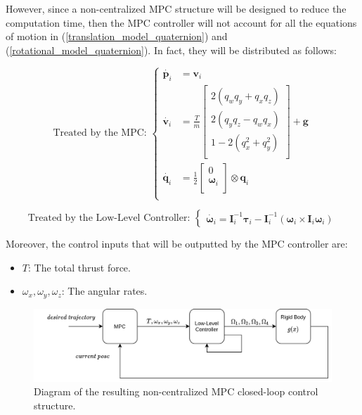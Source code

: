 \documentclass{thesisreport}
\begin{document}
However, since a non-centralized MPC structure will be designed to reduce the computation time, then the MPC controller will not account for all the equations of motion in (\ref{translation_model_quaternion}) and (\ref{rotational_model_quaternion}). In fact, they will be distributed as follows: 

				\begin{equation*}
					\text{Treated by the MPC: }\left\{
					\begin{array}{lll}				
					\dot{\bm{p}_i} &= \bm{v}_i \\
					\dot{\bm{v}_i} &= 
					\frac{T}{m} 
					\begin{bmatrix}
						2 (q_w q_y + q_x q_z) \\
						2 (q_y q_z - q_w q_x) \\
						1 - 2(q_x^2 + q_y^2 ) \\
					\end{bmatrix} + \bm{g} \\			
					\dot{\bm{q}_i} & = \frac{1}{2}
					\begin{bmatrix}
						0 \\
						\bm{\omega}_i \\
					\end{bmatrix} \otimes \bm{q}_i \\
					\end{array}
					\right.
				\end{equation*}
				
				\begin{equation*}
					\text{Treated by the Low-Level Controller: }\left\{
					\begin{array}{l}	
					\dot{\bm{\omega}_i} = \bm{I}_i^{-1} \bm{\tau}_i - \bm{I}_i^{-1} (\bm{\omega}_i \times \bm{I}_i \bm{\omega}_i)
					\end{array}
					\right.
				\end{equation*}

Moreover, the control inputs that will be outputted by the MPC controller are: 

\begin{itemize}
	\item $T$: The total thrust force.
	\item $\omega_x, \omega_y, \omega_z$: The angular rates. 
\end{itemize} 

\newpage

\begin{figure}[h]
	\centering
	\includegraphics[width=\textwidth]{Images/diagrams/new_sim_diagram.png}
	\caption{Diagram of the resulting non-centralized MPC closed-loop control structure.}
	\label{non_centralized_mpc_for_SIL}
\end{figure}
\end{document}
